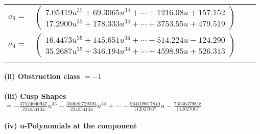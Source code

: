 \documentclass[1p]{elsarticle_modified}
\theoremstyle{definition}
\begin{document}
\begin{tabular}{m{7pt} m{180pt} m{7pt} m{180pt} }
\flushright $a_{9}=$&$\begin{pmatrix}7.05419 u^{35}+69.3065 u^{34}+\cdots+1216.08 u+157.152\\17.2900 u^{35}+178.333 u^{34}+\cdots+3753.55 u+479.519\end{pmatrix}$ \\
\flushright $a_{4}=$&$\begin{pmatrix}16.4473 u^{35}+145.651 u^{34}+\cdots-514.224 u-124.290\\35.2687 u^{35}+346.194 u^{34}+\cdots+4598.95 u+526.313\end{pmatrix}$\\&\end{tabular}
\flushleft \textbf{(ii) Obstruction class $= -1$}\\~\\
\flushleft \textbf{(iii) Cusp Shapes $= -\frac{37524040947}{224054134} u^{35}-\frac{350685729393}{224054134} u^{34}+\cdots-\frac{964109017840}{112027067} u-\frac{73536479818}{112027067}$}\\~\\
\newpage\renewcommand{\arraystretch}{1}
\flushleft \textbf{(iv) u-Polynomials at the component}\newline \\
\end{document}
